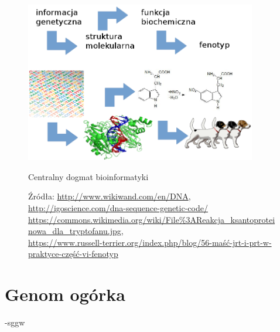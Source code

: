 \begin{figure}[h]
	\centering
	\includegraphics[width=0.9\textwidth]{img/centralny-dogmat.png}
	\caption{Centralny dogmat bioinformatyki}
	\vspace{-0.5cm}
	\caption*{\scriptsize Źródła: 
		\url{http://www.wikiwand.com/en/DNA},
		\url{http://igoscience.com/dna-sequence-genetic-code/} \\
		\url{https://commons.wikimedia.org/wiki/File\%3AReakcja\_ksantoproteinowa\_dla\_tryptofanu.jpg}, \\
		\url{https://www.russell-terrier.org/index.php/blog/56-maść-jrt-i-prt-w-praktyce-część-vi-fenotyp}
	}
	\label{img:centralny-dogmat}
\end{figure}



\section{Genom ogórka}
-sggw
